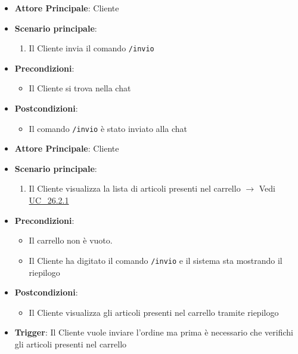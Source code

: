 \label{uc_26.1}
\begin{itemize}
    \item \textbf{Attore Principale}: Cliente
	\item \textbf{Scenario principale}: 
	\begin{enumerate}
		\item Il Cliente invia il comando \verb|/invio|
	\end{enumerate}
	\item \textbf{Precondizioni}: 
	\begin{itemize}
		\item Il Cliente si trova nella chat
	\end{itemize}
	\item \textbf{Postcondizioni}:
	\begin{itemize}
		\item Il comando \verb|/invio| è stato inviato alla chat
	\end{itemize} 
\end{itemize}

\label{uc_26.2}

\begin{itemize}
    \item \textbf{Attore Principale}: Cliente
    \item \textbf{Scenario principale}:
    \begin{enumerate}
        \item Il Cliente visualizza la lista di articoli presenti nel carrello $\rightarrow$ Vedi \hyperref[uc_26.2.1]{UC\_26.2.1}
    \end{enumerate}
    \item \textbf{Precondizioni}:
    \begin{itemize}
        \item Il carrello non è vuoto.
        \item Il Cliente ha digitato il comando \verb|/invio| e il sistema sta mostrando il riepilogo
    \end{itemize}
    \item \textbf{Postcondizioni}:
    \begin{itemize}
        \item Il Cliente visualizza gli articoli presenti nel carrello tramite riepilogo
    \end{itemize}
    \item \textbf{Trigger}: Il Cliente vuole inviare l'ordine ma prima è necessario che verifichi gli articoli presenti nel carrello
\end{itemize}

